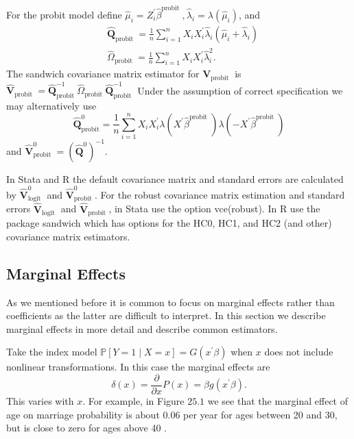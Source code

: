 \documentclass[10pt]{article}
\begin{document}
For the probit model define $\widehat{\mu}_{i}=Z_{i}^{\prime} \widehat{\beta}^{\text {probit }}, \widehat{\lambda}_{i}=\lambda\left(\widehat{\mu}_{i}\right)$, and
$$
\begin{aligned}
&\widehat{\boldsymbol{Q}}_{\text {probit }}=\frac{1}{n} \sum_{i=1}^{n} X_{i} X_{i}^{\prime} \widehat{\lambda}_{i}\left(\widehat{\mu}_{i}+\widehat{\lambda}_{i}\right) \\
&\widehat{\Omega}_{\text {probit }}=\frac{1}{n} \sum_{i=1}^{n} X_{i} X_{i}^{\prime} \widehat{\lambda}_{i}^{2} .
\end{aligned}
$$
The sandwich covariance matrix estimator for $\boldsymbol{V}_{\text {probit }}$ is $\widehat{\boldsymbol{V}}_{\text {probit }}=\widehat{\boldsymbol{Q}}_{\text {probit }}^{-1} \widehat{\Omega}_{\text {probit }} \widehat{\boldsymbol{Q}}_{\text {probit }}^{-1}$ Under the assumption of correct specification we may alternatively use
$$
\widehat{\boldsymbol{Q}}_{\mathrm{probit}}^{0}=\frac{1}{n} \sum_{i=1}^{n} X_{i} X_{i}^{\prime} \lambda\left(X^{\prime} \widehat{\beta}^{\text {probit }}\right) \lambda\left(-X^{\prime} \widehat{\beta}^{\text {probit }}\right)
$$
and $\widehat{\boldsymbol{V}}_{\text {probit }}^{0}=\left(\widehat{\boldsymbol{Q}}^{0}\right)^{-1}$.

In Stata and R the default covariance matrix and standard errors are calculated by $\widehat{\boldsymbol{V}}_{\text {logit }}^{0}$ and $\widehat{\boldsymbol{V}}_{\text {probit }}^{0}$. For the robust covariance matrix estimation and standard errors $\widehat{\boldsymbol{V}}_{\text {logit }}$ and $\widehat{\boldsymbol{V}}_{\text {probit }}$, in Stata use the option vce(robust). In R use the package sandwich which has options for the HC0, HC1, and HC2 (and other) covariance matrix estimators.

\subsection{Marginal Effects}
As we mentioned before it is common to focus on marginal effects rather than coefficients as the latter are difficult to interpret. In this section we describe marginal effects in more detail and describe common estimators.

Take the index model $\mathbb{P}[Y=1 \mid X=x]=G\left(x^{\prime} \beta\right)$ when $x$ does not include nonlinear transformations. In this case the marginal effects are
$$
\delta(x)=\frac{\partial}{\partial x} P(x)=\beta g\left(x^{\prime} \beta\right) .
$$
This varies with $x$. For example, in Figure $25.1$ we see that the marginal effect of age on marriage probability is about $0.06$ per year for ages between 20 and 30, but is close to zero for ages above 40 .
\end{document}
